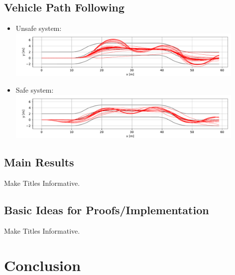 \documentclass{beamer}
\begin{document}
\subsection{Vehicle Path Following}
\begin{frame}
    \begin{itemize}
        \item Unsafe system:
            \includegraphics[width=0.9\textwidth]{figures/unsafe_200.pdf}
        \item Safe system:
            \includegraphics[width=0.9\textwidth]{figures/safe_200.pdf}
    \end{itemize}
\end{frame}

\subsection{Main Results}

\begin{frame}{Make Titles Informative.}
\end{frame}

\subsection{Basic Ideas for Proofs/Implementation}

\begin{frame}{Make Titles Informative.}
\end{frame}

\section*{Conclusion}
\end{document}
